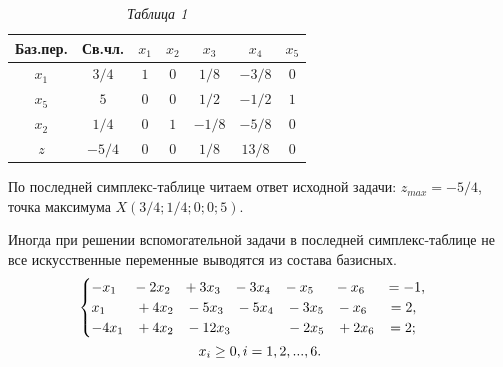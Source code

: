 \begin{table}[h]
\label{table_1_7}
\caption*{\hspace{0.8\linewidth} \textit{Таблица 1}}
\begin{center}
\renewcommand{\tabcolsep}{5pt}
\begin{tabular}{ | c | c | c | c | c | c | c | }
\hline
Баз.пер. & Св.чл. & $x_{1}$ & $x_{2}$ & $x_{3}$ & $x_{4}$ & $x_{5}$\\ \hline
$x_{1}$ & $3/4$ & $1$ & $0$ & $1/8$ & $-3/8$ & $0$\\ \hline
$x_{5}$ & $5$ & $0$ & $0$ & $1/2$ & $-1/2$ & $1$\\ \hline
$x_{2}$ & $1/4$ & $0$ & $1$ & $-1/8$ & $-5/8$ & $0$ \\ \hline
$z$ & $-5/4$ & $0$ & $0$ & $1/8$ & $13/8$ & $0$ \\ \hline
\end{tabular}
\end{center}
\end{table}

По последней симплекс-таблице читаем ответ исходной задачи:
$z_{max} = -5/4$, точка максимума $X(3/4; 1/4; 0; 0; 5)$.

Иногда при решении вспомогательной задачи в последней симплекс-таблице не все искусственные переменные выводятся из состава базисных.\\

\begin{gather*}
\begin{cases}
-x_{1}\hspace{4mm} -2x_{2}\hspace{3mm} +3x_{3}\hspace{3mm} -3x_{4}\hspace{3mm} -x_{5}\hspace{5mm} -x_{6}\hspace{5mm} = -1,\\
x_{1}\hspace{7,5mm} +4x_{2}\hspace{3mm} -5x_{3}\hspace{3mm} -5x_{4}\hspace{3mm} -3x_{5}\hspace{3mm} -x_{6}\hspace{5mm} = 2,\\
-4x_{1}\hspace{3mm} +4x_{2}\hspace{3mm} -12x_{3}\hspace{14mm}    -2x_{5}\hspace{3mm} +2x_{6}\hspace{3mm} = 2;
\end{cases}\\
x_{i}\geq0,i=1,2,...,6.
\end{gather*}

